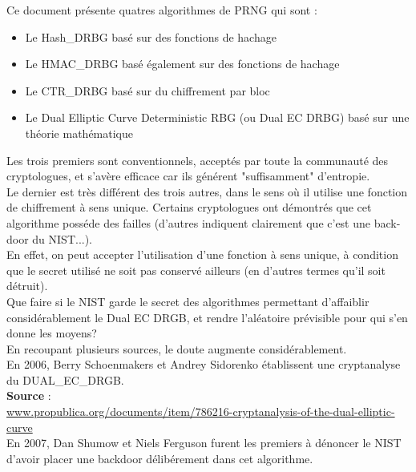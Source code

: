\documentclass{article}
\begin{document}
	Ce document présente quatres algorithmes de PRNG qui sont : 
	\begin{itemize}
		\item Le Hash\_DRBG basé sur des fonctions de hachage
		\item Le HMAC\_DRBG basé également sur des fonctions de hachage
		\item Le CTR\_DRBG basé sur du chiffrement par bloc
		\item Le Dual Elliptic Curve Deterministic RBG (ou Dual EC DRBG) basé 
		sur une théorie mathématique\\
	\end{itemize}

	Les trois premiers sont conventionnels, acceptés par toute la communauté 
	des cryptologues, et s'avère efficace car ils générent "suffisamment" 
	d'entropie.\\
	
	Le dernier est très différent des trois autres, dans le sens où il utilise 
	une fonction de chiffrement à sens unique. Certains cryptologues ont 
	démontrés que cet algorithme posséde des failles (d'autres indiquent 
	clairement que c'est une back-door du NIST...).\\
	
	En effet, on peut accepter l'utilisation d'une fonction à sens unique, à 
	condition que le secret utilisé ne soit pas conservé ailleurs (en d'autres 
	termes qu'il soit détruit).\\

	Que faire si le NIST garde le secret des algorithmes permettant 
	d'affaiblir considérablement le Dual EC DRGB, et rendre l'aléatoire 
	prévisible pour qui s'en donne les moyens?\\

	En recoupant plusieurs sources, le doute augmente considérablement.\\

	En 2006, Berry Schoenmakers et Andrey Sidorenko établissent une 
	cryptanalyse du DUAL\_EC\_DRGB.\\

	\textbf{Source} : \\
	\href{http://www.propublica.org/documents/item/786216-cryptanalysis-of-the-	dual-elliptic-curve}
	{www.propublica.org/documents/item/786216-cryptanalysis-of-the-dual-elliptic-curve}\\	
	
	
	En 2007, Dan Shumow et Niels Ferguson furent les premiers à dénoncer le 
	NIST d'avoir placer une backdoor délibérement dans cet algorithme.\\
\end{document}
